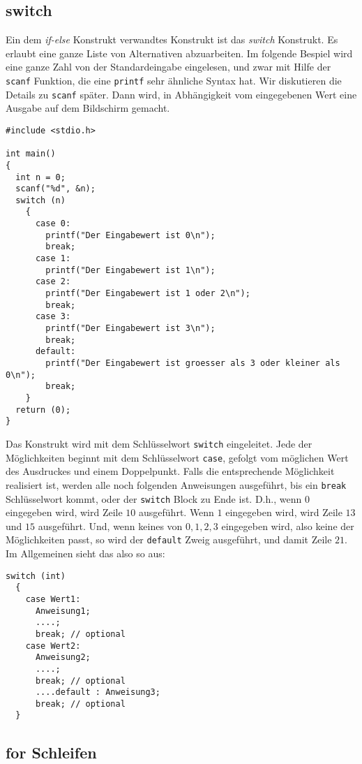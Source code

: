 \subsection{switch}

Ein dem \emph{if-else} Konstrukt verwandtes Konstrukt ist das \emph{switch} Konstrukt.
Es erlaubt eine ganze Liste von Alternativen abzuarbeiten.
Im folgende Bespiel wird eine ganze Zahl von der Standardeingabe eingelesen, und zwar mit Hilfe der \verb|scanf| Funktion, die eine \verb|printf| sehr ähnliche Syntax hat.
Wir diskutieren die Details zu \verb|scanf| später.
Dann wird, in Abhängigkeit vom eingegebenen Wert eine Ausgabe auf dem Bildschirm gemacht.
\begin{lstlisting}
#include <stdio.h>

int main()
{
  int n = 0;
  scanf("%d", &n);
  switch (n)
    {
      case 0:
        printf("Der Eingabewert ist 0\n");
        break;
      case 1:
        printf("Der Eingabewert ist 1\n");
      case 2:
        printf("Der Eingabewert ist 1 oder 2\n");
        break;
      case 3:
        printf("Der Eingabewert ist 3\n");
        break;
      default:
        printf("Der Eingabewert ist groesser als 3 oder kleiner als 0\n");
        break;
    }
  return (0);
}
\end{lstlisting}
Das Konstrukt wird mit dem Schlüsselwort \verb|switch| eingeleitet.
Jede der Möglichkeiten beginnt mit dem Schlüsselwort \verb|case|, gefolgt vom möglichen Wert des Ausdruckes und einem Doppelpunkt. 
Falls die entsprechende Möglichkeit realisiert ist, werden alle noch folgenden Anweisungen ausgeführt, bis ein \verb|break| Schlüsselwort kommt, oder der \verb|switch| Block zu Ende ist.
D.h., wenn $0$ eingegeben wird, wird Zeile $10$ ausgeführt.
Wenn $1$ eingegeben wird, wird Zeile $13$ und $15$ ausgeführt.
Und, wenn keines von $0,1,2,3$ eingegeben wird, also keine der Möglichkeiten passt, so wird der \verb|default| Zweig ausgeführt, und damit Zeile $21$.
Im Allgemeinen sieht das also so aus:
\begin{lstlisting}
switch (int)
  {
    case Wert1:
      Anweisung1;
      ....;
      break; // optional
    case Wert2:
      Anweisung2;
      ....;
      break; // optional
      ....default : Anweisung3;
      break; // optional
  }
\end{lstlisting}

\subsection{for Schleifen}

